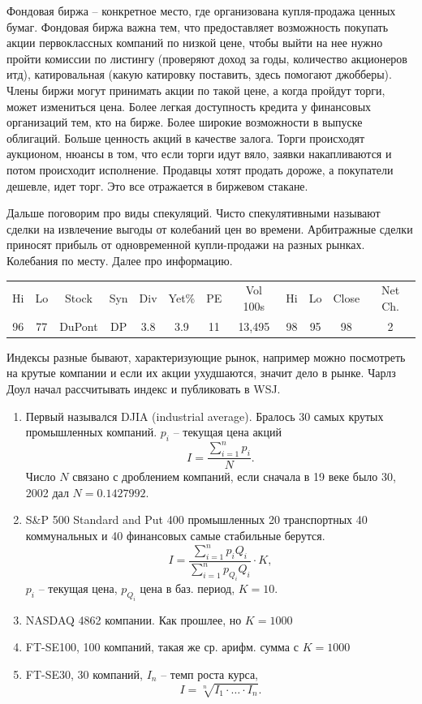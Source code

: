 \documentclass[a4paper, 12pt]{article}
\begin{document}
Фондовая биржа -- конкретное место, где организована купля-продажа ценных бумаг. Фондовая биржа важна тем, что предоставляет возможность покупать акции первоклассных компаний по низкой цене, чтобы выйти на нее нужно пройти комиссии по листингу (проверяют доход за годы, количество акционеров итд), катировальная (какую катировку поставить, здесь помогают джобберы). Члены биржи могут принимать акции по такой цене, а когда пройдут торги, может измениться цена. Более легкая доступность кредита у финансовых организаций тем, кто на бирже. Более широкие возможности в выпуске облигаций. Больше ценность акций в качестве залога. Торги происходят аукционом, нюансы в том, что если торги идут вяло, заявки накапливаются и потом происходит исполнение. Продавцы хотят продать дороже, а покупатели дешевле, идет торг. Это все отражается в биржевом стакане. 

Дальше поговорим про виды спекуляций. Чисто спекулятивными называют сделки на извлечение выгоды от колебаний цен во времени. Арбитражные сделки приносят прибыль от одновременной купли-продажи на разных рынках. Колебания по месту. Далее про информацию. 

\begin{center}
\begin{tabular}{ c c c c c c c c c c c c }
Hi & Lo & Stock & Syn & Div & Yet\% & PE & Vol 100s & Hi & Lo & Close & Net Ch. \\
96 & 77 & DuPont & DP & 3.8 & 3.9 & 11 & 13,495 & 98 & 95 & 98 & 2\\
\end{tabular}
\end{center}

Индексы разные бывают, характеризующие рынок, например можно посмотреть на крутые компании и если их акции ухудшаются, значит дело в рынке. Чарлз Доул начал рассчитывать индекс и публиковать в WSJ. 
\begin{enumerate}
\item Первый назывался DJIA (industrial average). Бралось 30 самых крутых промышленных компаний. $p_i$ -- текущая цена акций
$$ I = \frac{\sum_{i=1}^{n} p_i}{N}. $$
Число $N$ связано с дроблением компаний, если сначала в 19 веке было 30, 2002 дал $N=0.1427992$. 
\item S\&P 500 Standard and Put 400 промышленных 20 транспортных 40 коммунальных и 40 финансовых самые стабильные берутся. 
$$ I = \frac{\sum_{i=1}^{n}p_i Q_i}{\sum_{i=1}^{n}p_{Q_i} Q_i}\cdot K, $$
$p_i$ -- текущая цена, $p_{Q_i}$ цена в баз. период, $K=10$.
\item NASDAQ 4862 компании. Как прошлее, но $K=1000$
\item FT-SE100, 100 компаний, такая же ср. арифм. сумма с $K=1000$
\item FT-SE30, 30 компаний, $I_n$ -- темп роста курса,
$$ I = \sqrt[n]{I_1\cdot\ldots\cdot I_n}. $$
\end{enumerate}
\end{document}

